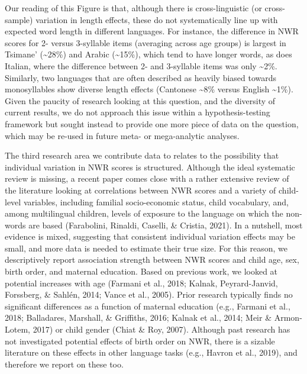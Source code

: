 \documentclass[english,,man,floatsintext]{apa6}
\begin{document}
Our reading of this Figure is that, although there is cross-linguistic (or cross-sample) variation in length effects, these do not systematically line up with expected word length in different languages. For instance, the difference in NWR scores for 2- versus 3-syllable items (averaging across age groups) is largest in Tsimane' (\textasciitilde{}28\%) and Arabic (\textasciitilde{}15\%), which tend to have longer words, as does Italian, where the difference between 2- and 3-syllable items was only \textasciitilde{}2\%. Similarly, two languages that are often described as heavily biased towards monosyllables show diverse length effects (Cantonese \textasciitilde{}8\% versus English \textasciitilde{}1\%). Given the paucity of research looking at this question, and the diversity of current results, we do not approach this issue within a hypothesis-testing framework but sought instead to provide one more piece of data on the question, which may be re-used in future meta- or mega-analytic analyses.

The third research area we contribute data to relates to the possibility that individual variation in NWR scores is structured. Although the ideal systematic review is missing, a recent paper comes close with a rather extensive review of the literature looking at correlations between NWR scores and a variety of child-level variables, including familial socio-economic status, child vocabulary, and, among multilingual children, levels of exposure to the language on which the non-words are based (Farabolini, Rinaldi, Caselli, \& Cristia, 2021). In a nutshell, most evidence is mixed, suggesting that consistent individual variation effects may be small, and more data is needed to estimate their true size. For this reason, we descriptively report association strength between NWR scores and child age, sex, birth order, and maternal education. Based on previous work, we looked at potential increases with age (Farmani et al., 2018; Kalnak, Peyrard-Janvid, Forssberg, \& Sahlén, 2014; Vance et al., 2005). Prior research typically finds no significant differences as a function of maternal education (e.g., Farmani et al., 2018; Balladares, Marshall, \& Griffiths, 2016; Kalnak et al., 2014; Meir \& Armon-Lotem, 2017) or child gender (Chiat \& Roy, 2007). Although past research has not investigated potential effects of birth order on NWR, there is a sizable literature on these effects in other language tasks (e.g., Havron et al., 2019), and therefore we report on these too.
\end{document}
